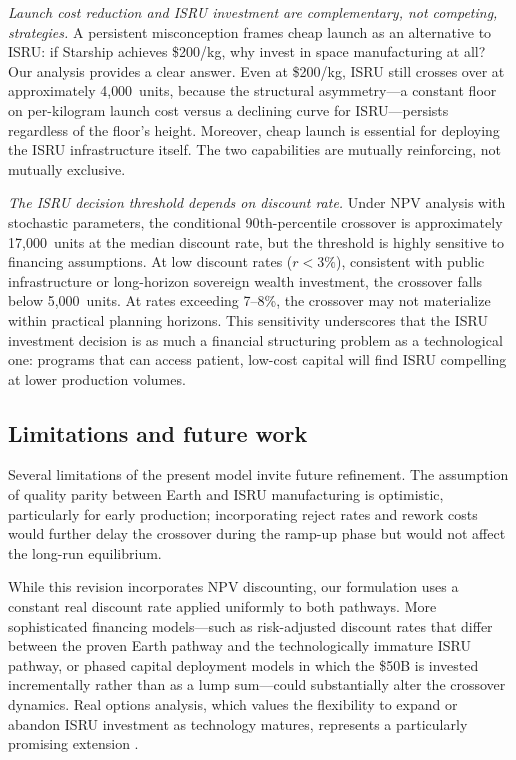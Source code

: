 \documentclass[preprint,12pt]{elsarticle}
\begin{document}
\emph{Launch cost reduction and ISRU investment are complementary, not competing, strategies.} A persistent misconception frames cheap launch as an alternative to ISRU: if Starship achieves \$200/kg, why invest in space manufacturing at all? Our analysis provides a clear answer. Even at \$200/kg, ISRU still crosses over at approximately 4{,}000~units, because the structural asymmetry---a constant floor on per-kilogram launch cost versus a declining curve for ISRU---persists regardless of the floor's height. Moreover, cheap launch is essential for deploying the ISRU infrastructure itself. The two capabilities are mutually reinforcing, not mutually exclusive.

\emph{The ISRU decision threshold depends on discount rate.} Under NPV analysis with stochastic parameters, the conditional 90th-percentile crossover is approximately 17{,}000~units at the median discount rate, but the threshold is highly sensitive to financing assumptions. At low discount rates ($r < 3\%$), consistent with public infrastructure or long-horizon sovereign wealth investment, the crossover falls below 5{,}000~units. At rates exceeding 7--8\%, the crossover may not materialize within practical planning horizons. This sensitivity underscores that the ISRU investment decision is as much a financial structuring problem as a technological one: programs that can access patient, low-cost capital will find ISRU compelling at lower production volumes.

\subsection{Limitations and future work}

Several limitations of the present model invite future refinement. The assumption of quality parity between Earth and ISRU manufacturing is optimistic, particularly for early production; incorporating reject rates and rework costs would further delay the crossover during the ramp-up phase but would not affect the long-run equilibrium.

While this revision incorporates NPV discounting, our formulation uses a constant real discount rate applied uniformly to both pathways. More sophisticated financing models---such as risk-adjusted discount rates that differ between the proven Earth pathway and the technologically immature ISRU pathway, or phased capital deployment models in which the \$50B is invested incrementally rather than as a lump sum---could substantially alter the crossover dynamics. Real options analysis, which values the flexibility to expand or abandon ISRU investment as technology matures, represents a particularly promising extension \cite{sowers2021}.
\end{document}
